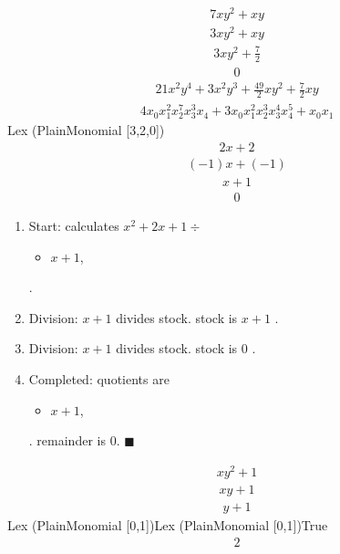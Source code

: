 \documentclass{jsarticle}
\begin{document}
\begin{align}
7xy^2+xy
\end{align}
\begin{align}
3xy^2+xy
\end{align}
\begin{align}
3xy^2+\frac{7}{2}
\end{align}
\begin{align}
0
\end{align}
\begin{align}
21x^2y^4+3x^2y^3+\frac{49}{2}xy^2+\frac{7}{2}xy
\end{align}
\begin{align}
4x_0x_1^2x_2^7x_3^3x_4+3x_0x_1^2x_2^3x_3^4x_4^5+x_0x_1
\end{align}
Lex (PlainMonomial [3,2,0])\begin{align}
2x+2
\end{align}
\begin{align}
(-1)x+(-1)
\end{align}
\begin{align}
x+1
\end{align}
\begin{align}
0
\end{align}
\begin{enumerate}
\item Start: calculates $x^2+2x+1\div $\begin{itemize}
\item $x+1$, 
\end{itemize} .  

\item Division: $x+1$ divides stock. stock is $x+1$ .  
\item Division: $x+1$ divides stock. stock is $0$ .  
\item Completed: quotients are \begin{itemize}
\item $x+1$, 
\end{itemize} .  
remainder is $0$.  $\blacksquare$
\end{enumerate}
\begin{align}
xy^2+1
\end{align}
\begin{align}
xy+1
\end{align}
\begin{align}
y+1
\end{align}
Lex (PlainMonomial [0,1])Lex (PlainMonomial [0,1])True\begin{align}
2
\end{align}
\end{document}
